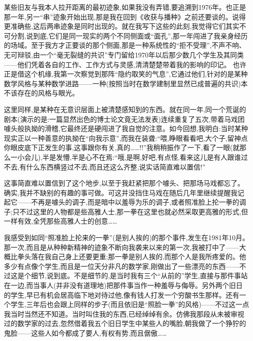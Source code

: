 某些旧友与我本人拉开距离的最初迹象,如果我没有弄错,要追溯到1976年。也正是那一年,另一“串”迹象开始出现,那是我在回到《收获与播种》之前还要谈的。说得更准确些,这后两串迹象是同时出现的。就在我写下这些的此刻,我觉得它们其实不可分割,说到底,它们是同一现实的两个不同侧面或“面孔”,那一年闯进了我亲身经历的场域。至于我方才正要谈的那个侧面,那是一种系统性的“拒不受理”,\dmark 不声不响、无可辩驳,由一个“毫无裂缝的共识”专门留给1970年以后那少数几个学生及其同类——他们凭着各自的工作、工作方式与灵感,清清楚楚带着我的影响的印记。
也许正是借这个机缘,我第一次察觉到那阵“隐约取笑的气息”,它通过他们,针对的是某种数学风格与某种数学进路——一种(按照当时在数学建制里显然已成普遍的共识)本不该存在的风格与眼光。

这里同样,是某种在无意识层面上被清楚感知到的东西。就在同一年,同一个荒诞的剧本(演示的是:一篇显然出色的博士论文竟无法发表)连续重复了五次,带着马戏团噱头般执拗的滑稽,它最终还是硬闯进了我自觉的注意。如今回想,我明白:当时某种现实正以一种善意的执拗在“向我示意”,而我在装聋:“喂,睁眼看看吧,大个子,留神点你眼皮底下正发生的事,这事跟你有关,真的……!!”我稍稍振作了一下,看了一眼(就那么一小会儿),半是发懵,半是心不在焉:“哦,是啊,好吧,有点怪,看来这儿是有人跟谁过不去,有什么东西横竖过不去,而且还这么齐整,说实话简直难以置信!”

这事简直难以置信到了这个地步,以至于我赶紧把那个噱头、把那场马戏都忘了。确实,我并不缺别的有趣的事可做。可这并没挡住马戏在随后几年里继续提醒我记起它——不再是噱头的调子,而是暗中以羞辱为乐的调子,或者照准脸上抡一拳的调子;只不过这里的人物都是些高雅人士,那一拳在这里也就必然采取更高雅的形式,但一样有效,全凭那些高雅人士的创意……

我感受到如同“照准脸上抡来的一拳”(是别人挨的)的那个事件,发生在1981年10月。那一次,而且是从种种新精神的迹象不断向我袭来以来的第一次,我被打中了——大概比拳头落在我自己身上还要更重;那一拳是别人挨的,而那个人是我所疼爱的。他多少有点像个学生,而且是一位天分非凡的数学家,刚做出了一些漂亮的东西——不过这是个细节,说到底。不是细节的,是当时我有三个“从前的”学生,直接与那件事站在一边,而当事人(并非没有道理地)把那件事当作一种羞辱与侮辱。另外两个旧日的学生,早已有机会居高临下地对待过他,像有钱人打发一个穷酸书生那样。还有一个学生,三年后也会跟上同样的步子(而且依旧是“照脸一拳”的风格)——不过这一点我当时当然还不知道。当时叫住我的东西,已经绰绰有余。仿佛我那段从未被审视过的数学家的过去,忽然借着我五个旧日学生中某些人的嘴脸,朝我做了一个狰狞的鬼脸——这些人如今都成了要人,有权有势,而且倨傲……

